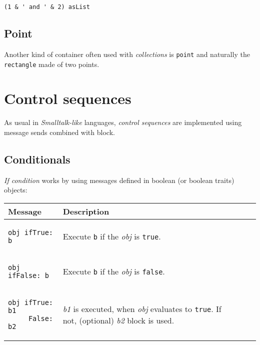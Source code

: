 \documentclass[10pt]{article}
\begin{document}
\begin{multicols*}{3}
\nointerlineskip\begin{lstlisting}
(1 & ' and ' & 2) asList
\end{lstlisting}\nointerlineskip



\subsection{Point}
Another kind of container often used with \textit{collections} is \texttt{point} and naturally the \texttt{rectangle} made of two points.




\vfill
\columnbreak
\section{Control sequences}
As usual in \textit{Smalltalk-like} languages, \textit{control sequences} are implemented using message sends combined with block.




\subsection{Conditionals}
\textit{If condition} works by using messages defined in boolean (or boolean traits) objects:

\vspace*{0.2cm}

\small{\begin{tabular}{ p{70pt} p{140pt} l l }
Message & Description
\\ \hline %
\begin{lstlisting}
obj ifTrue: b
\end{lstlisting}
&\vspace*{0.25cm}
Execute \texttt{b} if the \textit{obj} is \texttt{true}.

\\ \hline %
\begin{lstlisting}
obj ifFalse: b
\end{lstlisting}
&\vspace*{0.25cm}
Execute \texttt{b} if the \textit{obj} is \texttt{false}.
\\\hline %

\begin{lstlisting}
obj ifTrue: b1
     False: b2
\end{lstlisting}
&\vspace*{0.1cm}
\textit{b1} is executed, when \textit{obj} evaluates to \texttt{true}.
If not, (optional) \textit{b2} block is used.
\\\hline %


\end{tabular}}
\end{multicols*}
\end{document}
